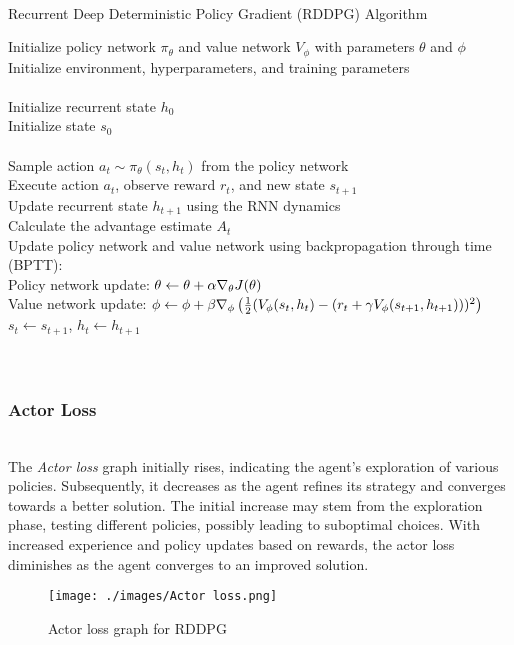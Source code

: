 \documentclass[preprint,12pt]{elsarticle}
\begin{document}
\begin{algorithm}\\
\caption{Recurrent Deep Deterministic Policy Gradient (RDDPG) Algorithm}
\begin{algorithmic}
    \STATE Initialize policy network $\pi_{\theta}$ and value network $V_{\phi}$ with parameters $\theta$ and $\phi$\\
    \STATE Initialize environment, hyperparameters, and training parameters\\
    \\
        \STATE Initialize recurrent state $h_0$\\
        \STATE Initialize state $s_0$\\
        \\
            \STATE Sample action $a_t \sim \pi_{\theta}(s_t, h_t)$ from the policy network\\
            \STATE Execute action $a_t$, observe reward $r_t$, and new state $s_{t+1}$\\
            \STATE Update recurrent state $h_{t+1}$ using the RNN dynamics\\
            \STATE Calculate the advantage estimate $A_t$\\
            \STATE Update policy network and value network using backpropagation through time (BPTT):\\
            \STATE \quad Policy network update: $\theta \leftarrow \theta + \alpha \nabla_\theta\\ J(\theta)$\\
            \STATE \quad Value network update: $\phi \leftarrow \phi + \beta \nabla_\phi\\ \left(\frac{1}{2}(V_\phi(s_t, h_t) - (r_t + \gamma V_\phi(s_{t+1}, h_{t+1})))^2\right)$\\
            \STATE $s_t \leftarrow s_{t+1}$, $h_t \leftarrow h_{t+1}$\\
        \ENDFOR\\
    \ENDFOR\\
\end{algorithmic}
\end{algorithm}

\subsubsection{Actor Loss}\\
The \textit{Actor loss} graph initially rises, indicating the agent's exploration of various policies. Subsequently, it decreases as the agent refines its strategy and converges towards a better solution. The initial increase may stem from the exploration phase, testing different policies, possibly leading to suboptimal choices. With increased experience and policy updates based on rewards, the actor loss diminishes as the agent converges to an improved solution.
\begin{figure}[!htbp]
    \centering
    \texttt{[image: ./images/Actor loss.png]}
    \caption{Actor loss graph for RDDPG}
\end{figure}\\
\end{document}
